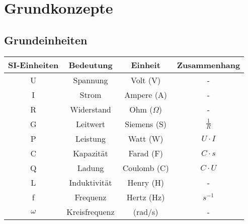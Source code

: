 \chapter{Grundkonzepte}

\section{Grundeinheiten}

\setlength{\tabcolsep}{4pt} %
\renewcommand{\arraystretch}{1.25} %
\begin{table}[!htb]
    \centering
    \begin{tabular}{|c|c|c|c|}
        \hline
        \textbf{SI-Einheiten}   & \textbf{Bedeutung}        & \textbf{Einheit}                  & \textbf{Zusammenhang}              \\ \hline
        U                       & Spannung                  & Volt (V)                          & -                                  \\
        I                       & Strom                     & Ampere (A)                        & -                                  \\
        R                       & Widerstand                & Ohm ($\Omega$)                    & -                                  \\
        G                       & Leitwert                  & Siemens (S)                       & $\frac{1}{R}$                      \\
        P                       & Leistung                  & Watt (W)                          & $U\cdot I$                         \\
        C                       & Kapazität                 & Farad (F)                         & $C\cdot s$                         \\
        Q                       & Ladung                    & Coulomb (C)                       & $C \cdot U$                        \\
        L                       & Induktivität              & Henry (H)                         & -                                  \\
        f                       & Frequenz                  & Hertz (Hz)                        & $s^{-1}$                           \\ 
        $\omega$                & Kreisfrequenz             & (rad/s)                           & -                                  \\

\end{tabular}
\end{table}
